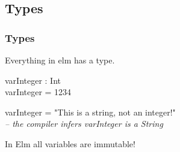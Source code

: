 \subsection{Types}
    \begin{frame}
        \frametitle{Types}

        Everything in elm has a type.
        \newline
        
        \begin{example}
            varInteger : Int\\
            varInteger = 1234
        \end{example}
        \begin{example}
            varInteger = "This is a string, not an integer!"\\
            
            \quad\textit{ -- the compiler infers varInteger is a String}
        \end{example}
        In Elm all variables are immutable!
        
    \end{frame}